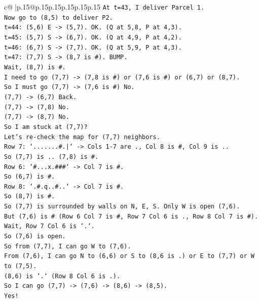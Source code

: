 \documentclass{article}
\begin{document}
{\begin{supertabular}{c@{$\;$}|p{.15\linewidth}@{}p{.15\linewidth}p{.15\linewidth}p{.15\linewidth}p{.15\linewidth}p{.15\linewidth}}
{{{\texttt{At t=43, I deliver Parcel 1.} \\
\texttt{Now go to (8,5) to deliver P2.} \\
\texttt{t=44: (5,6) E {-}> (5,7). OK. (Q at 5,8, P at 4,3).} \\
\texttt{t=45: (5,7) S {-}> (6,7). OK. (Q at 4,9, P at 4,2).} \\
\texttt{t=46: (6,7) S {-}> (7,7). OK. (Q at 5,9, P at 4,3).} \\
\texttt{t=47: (7,7) S {-}> (8,7 is \#). BUMP.} \\
\texttt{Wait, (8,7) is \#.} \\
\texttt{I need to go (7,7) {-}> (7,8 is \#) or (7,6 is \#) or (6,7) or (8,7).} \\
\texttt{So I must go (7,7) {-}> (7,6 is \#) No.} \\
\texttt{(7,7) {-}> (6,7) Back.} \\
\texttt{(7,7) {-}> (7,8) No.} \\
\texttt{(7,7) {-}> (8,7) No.} \\
\texttt{So I am stuck at (7,7)?} \\
\texttt{Let's re{-}check the map for (7,7) neighbors.} \\
\texttt{Row 7: `.......\#.|` {-}> Cols 1{-}7 are ., Col 8 is \#, Col 9 is ..} \\
\texttt{So (7,7) is .. (7,8) is \#.} \\
\texttt{Row 6: `\#...x.\#\#\#` {-}> Col 7 is \#.} \\
\texttt{So (6,7) is \#.} \\
\texttt{Row 8: `.\#.q..\#..` {-}> Col 7 is \#.} \\
\texttt{So (8,7) is \#.} \\
\texttt{So (7,7) is surrounded by walls on N, E, S. Only W is open (7,6).} \\
\texttt{But (7,6) is \# (Row 6 Col 7 is \#, Row 7 Col 6 is ., Row 8 Col 7 is \#).} \\
\texttt{Wait, Row 7 Col 6 is `.`.} \\
\texttt{So (7,6) is open.} \\
\texttt{So from (7,7), I can go W to (7,6).} \\
\texttt{From (7,6), I can go N to (6,6) or S to (8,6 is .) or E to (7,7) or W to (7,5).} \\
\texttt{(8,6) is `.` (Row 8 Col 6 is .).} \\
\texttt{So I can go (7,7) {-}> (7,6) {-}> (8,6) {-}> (8,5).} \\
\texttt{Yes!} \\
}}}
\end{supertabular}}
\end{document}
